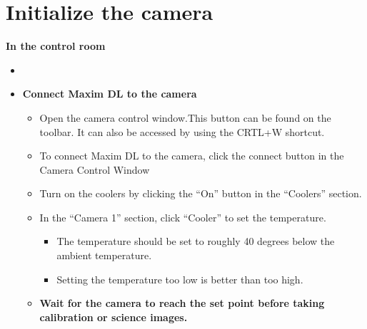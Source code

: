 \documentclass[letterpaper, 12pt]{report}
\begin{document}
\section{Initialize the camera}
{\large \textbf{In the control room}}
\begin{itemize}
\item []
\end{itemize}
\begin{itemize}
	\item \textbf{Connect Maxim DL to the camera}
	\begin{itemize}
		\item Open the camera control window.This button can be found on the toolbar. It can also be accessed by using the CRTL+W shortcut.
		\item To connect Maxim DL to the camera, click the connect button in the Camera Control Window
		\item Turn on the coolers by clicking the ``On'' button in the ``Coolers'' section.
		\item In the ``Camera 1'' section, click ``Cooler'' to set the temperature.
		\begin{itemize}
			\item The temperature should be set to roughly 40 degrees below the ambient temperature.
			\item Setting the temperature too low is better than too high.
		\end{itemize}
		\item {\large \textbf{Wait for the camera to reach the set point before taking calibration or science images.}}
	\end{itemize}
\end{itemize}
\end{document}
